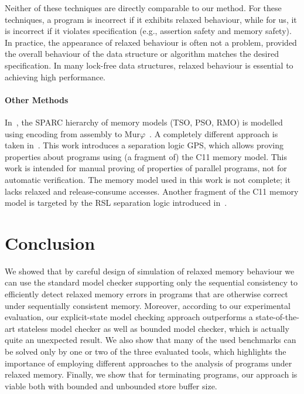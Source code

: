 Neither of these techniques are directly comparable to our method.
For these techniques, a program is incorrect if it exhibits relaxed behaviour, while for us, it is incorrect if it violates specification (e.g., assertion safety and memory safety).
In practice, the appearance of relaxed behaviour is often not a problem, provided the overall behaviour of the data structure or algorithm matches the desired specification.
In many lock-free data structures, relaxed behaviour is essential to achieving high performance.

\paragraph{Other Methods}\label{other-methods}

In~, the SPARC hierarchy of memory models (TSO, PSO, RMO) is modelled using encoding from assembly to Mur\(\varphi\)~.
A completely different approach is taken in~.
This work introduces a separation logic GPS, which allows proving properties about programs using (a fragment of) the C11 memory model.
This work is intended for manual proving of properties of parallel programs, not for automatic verification.
The memory model used in this work is not complete; it lacks relaxed and release-consume accesses.
Another fragment of the C11 memory model is targeted by the RSL separation logic introduced in~.



\section{Conclusion} \label{sec:conclusion}

We showed that by careful design of simulation of relaxed memory behaviour we
can use the standard model checker supporting only the sequential consistency to
efficiently detect relaxed memory errors in programs that are otherwise correct
under sequentially consistent memory. Moreover, according to our experimental
evaluation, our explicit-state model checking approach outperforms
a state-of-the-art stateless model checker as well as bounded model checker,
which is actually quite an unexpected result. We also show that many of the used
benchmarks can be solved only by one or two of the three evaluated tools, which
highlights the importance of employing different approaches to the analysis of programs
under relaxed memory. Finally, we show that for terminating programs, our
approach is viable both with bounded and unbounded store buffer size.


